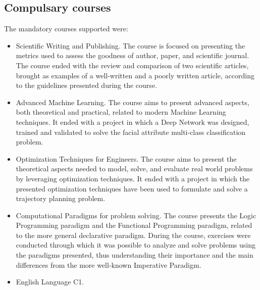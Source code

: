 \subsection{Compulsary courses}
The mandatory courses supported were:
\begin{itemize}
    \item Scientific Writing and Publishing. The course is focused on presenting the metrics used to assess the goodness of author, paper, and scientific journal. The course ended with the review and comparison of two scientific articles, brought as examples of a well-written and a poorly written article, according to the guidelines presented during the course. 
    \item Advanced Machine Learning. The course aims to present advanced aspects, both theoretical and practical, related to modern Machine Learning techniques. It ended with a project in which a Deep Network was designed, trained and validated to solve the facial attribute multi-class classification problem.
    \item Optimization Techniques for Engineers. The course aims to present the theoretical aspects needed to model, solve, and evaluate real world problems by leveraging optimization techniques. It ended with a project in which the presented optimization techniques have been used to formulate and solve a trajectory planning problem.
    \item Computational Paradigms for problem solving. The course presents the Logic Programming paradigm and the Functional Programming paradigm, related to the more general declarative paradigm. During the course, exercises were conducted through which it was possible to analyze and solve problems using the paradigms presented, thus understanding their importance and the main differences from the more well-known Imperative Paradigm.
    \item English Language C1.
\end{itemize}
